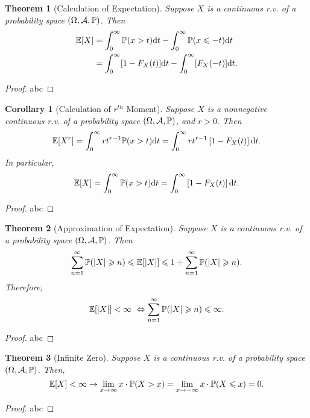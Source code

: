 \documentclass[openany,12pt]{book}
\newtheorem{theorem}{Theorem}[chapter]
\newtheorem{corollary}{Corollary}[chapter]
\begin{document}
\begin{theorem}[Calculation of Expectation]
Suppose $X$ is a continuous r.v. of a probability space $(\Omega,\mathcal{A},\mathbb{P})$.
Then
$$\begin{aligned}
\mathbb{E}[X]&=\int_{0}^{\infty}\mathbb{P}(x>t)\mathrm{d} t-\int_{0}^{\infty}\mathbb{P}(x\leqslant-t)\mathrm{d} t\\
&=\int_{0}^{\infty}[1-F_X(t)]\mathrm{d} t-\int_{0}^{\infty}[F_X(-t)]\mathrm{d} t.
\end{aligned}$$
\end{theorem}

\begin{proof}
  abc
\end{proof}

\begin{corollary}[Calculation of $r^{th}$ Moment]
Suppose $X$ is a nonnegative continuous r.v. of a probability space $(\Omega,\mathcal{A},\mathbb{P})$, and $r>0.$ Then
$$
\mathbb{E}[ X^{r}] = \int_{0}^{\infty}{rt^{r - 1}}\mathbb{P}(x > t)\mathrm{d} t = \int_{0}^{\infty}{rt^{r - 1}}\left[ 1 - F_{X}( t ) \right]\mathrm{d} t.
$$
In particular,
$$
\mathbb{E}[ X] = \int_{0}^{\infty}{\mathbb{P}(x > t)}\mathrm{d} t = \int_{0}^{\infty}\left[ 1 - F_{X}(t) \right]\mathrm{d} t.
$$
\end{corollary}

\begin{proof}
  abc
\end{proof}

\begin{theorem}[Approximation of Expectation]
Suppose $X$ is a continuous r.v. of a probability space $(\Omega,\mathcal{A},\mathbb{P})$. Then
$$
\sum_{n = 1}^{\infty}{\mathbb{P}(|X| \geqslant n)} \leqslant \mathbb{E}[|X|] \leqslant 1 + \sum_{n = 1}^{\infty}{\mathbb{P}( \left| X \right| \geqslant n )}.
$$
Therefore,
$$
\mathbb{E}[|X|] < \infty\  \Leftrightarrow \sum_{n = 1}^{\infty}{\mathbb{P}(|X| \geqslant n)} \leqslant \infty.
$$
\end{theorem}

\begin{proof}
  abc
\end{proof}

\begin{theorem}[Infinite Zero]
Suppose $X$ is a continuous r.v. of a probability space $(\Omega,\mathcal{A},\mathbb{P})$. Then,
$$
\mathbb{E}[ X] < \infty \to \lim_{x \to \infty}{x \cdot \mathbb{P}(X > x)} = \lim_{x \to - \infty}{x \cdot \mathbb{P}(X \leqslant x)} = 0.
$$
\end{theorem}

\begin{proof}
  abc
\end{proof}
\end{document}
